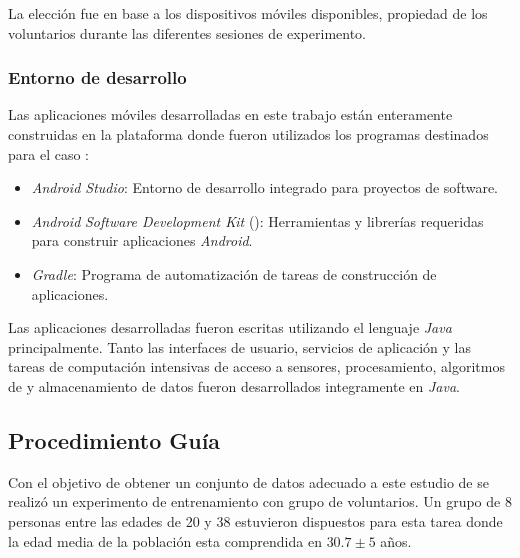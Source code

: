 La elección fue en base a los dispositivos móviles disponibles, propiedad
de los voluntarios durante las diferentes sesiones de experimento.

\subsubsection{Entorno de desarrollo }

Las aplicaciones móviles desarrolladas en este trabajo están enteramente
construidas en la plataforma \emph{} donde fueron utilizados
los programas destinados para el caso \cite{Android2016}:
\begin{itemize}
\item \emph{Android Studio}: Entorno de desarrollo integrado para proyectos\emph{
}de software.
\item \emph{Android} \emph{Software Development Kit }(): Herramientas
y librerías  requeridas para construir aplicaciones \emph{Android}.
\item \emph{Gradle}: Programa de automatización de tareas de construcción
de aplicaciones.
\end{itemize}
Las aplicaciones desarrolladas fueron escritas utilizando el lenguaje
\emph{Java }principalmente. Tanto las interfaces de usuario, servicios
de aplicación y las tareas de computación intensivas de acceso a sensores,
procesamiento, algoritmos de  y almacenamiento de datos
fueron desarrollados integramente en \emph{Java}.

\subsection{Procedimiento Guía }

Con el objetivo de obtener un conjunto de datos adecuado a este estudio
de  se realizó un experimento de entrenamiento con grupo
de voluntarios. Un grupo de 8 personas entre las edades de 20 y 38
estuvieron dispuestos para esta tarea donde la edad media de la población
esta comprendida en $30.7\pm5$ años. 

